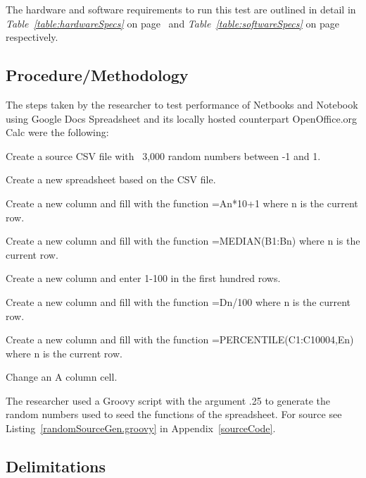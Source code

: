 The hardware and software requirements to run this test are outlined in detail
in \emph{Table~\ref{table:hardwareSpecs}} on page~\pageref{table:hardwareSpecs}
and \emph{Table~\ref{table:softwareSpecs}} on page~\pageref{table:softwareSpecs}
respectively.





\subsection{Procedure/Methodology}


The steps taken by the researcher to test performance of Netbooks and Notebook
using Google Docs Spreadsheet and its locally hosted counterpart OpenOffice.org
Calc were the following:

\begin{compactenum}
\item Create a source CSV file with ~3,000 random numbers between -1 and 1.
\item Create a new spreadsheet based on the CSV file.
\item Create a new column and fill with the function =An*10+1 where n is the
  current row.
\item Create a new column and fill with the function =MEDIAN(B1:Bn) where n is
  the current row.
\item Create a new column and enter 1-100 in the first hundred rows.
\item Create a new column and fill with the function =Dn/100 where n is the
  current row.
\item Create a new column and fill with the function =PERCENTILE(C1:C10004,En)
  where n is the current row.
\item Change an A column cell.
\end{compactenum}

The researcher used a Groovy script with the argument .25 to generate the random
numbers used to seed the functions of the spreadsheet.  For source
see Listing~\ref{randomSourceGen.groovy} in Appendix~\ref{sourceCode}.

\subsection{Delimitations}


